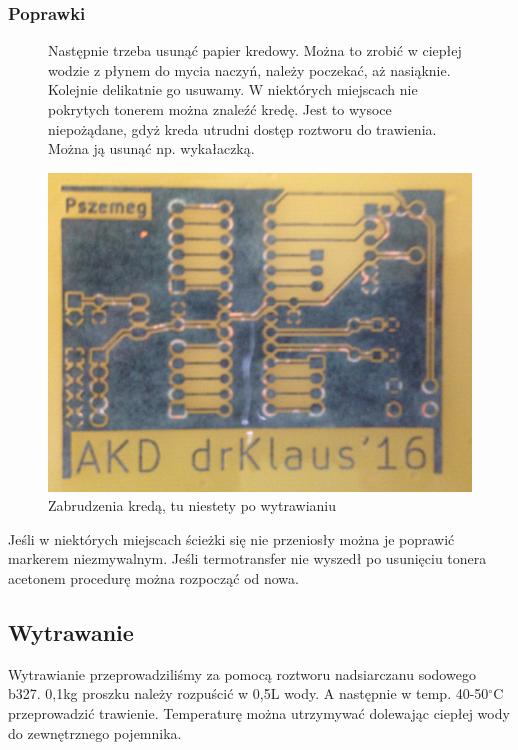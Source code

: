 \documentclass[a4paper,11pt]{article}
\def\SCALE{0.6}
\begin{document}
\subsubsection{Poprawki}

\begin{figure}[H]
	Następnie trzeba usunąć papier kredowy. Można to zrobić w ciepłej wodzie z płynem do mycia naczyń, należy poczekać, aż nasiąknie. Kolejnie delikatnie go usuwamy. W niektórych miejscach nie pokrytych tonerem można znaleźć kredę. Jest to wysoce niepożądane, gdyż kreda utrudni dostęp roztworu do trawienia. Można ją usunąć np. wykałaczką.

	\centering
	\includegraphics[width=\SCALE
	\paperwidth]{ZabrudzeniaKreda}
	\caption{Zabrudzenia kredą, tu niestety po wytrawianiu}
\end{figure}


Jeśli w niektórych miejscach ścieżki się nie przeniosły można je poprawić markerem niezmywalnym.
Jeśli termotransfer nie wyszedł po usunięciu tonera acetonem procedurę można rozpocząć od nowa.
\subsection{Wytrawanie}

Wytrawianie przeprowadziliśmy za pomocą roztworu nadsiarczanu sodowego b327. 0,1kg proszku należy rozpuścić w 0,5L wody. A następnie w temp. 40-50$^\circ$C przeprowadzić trawienie. Temperaturę można utrzymywać dolewając ciepłej wody do zewnętrznego pojemnika.
\end{document}
